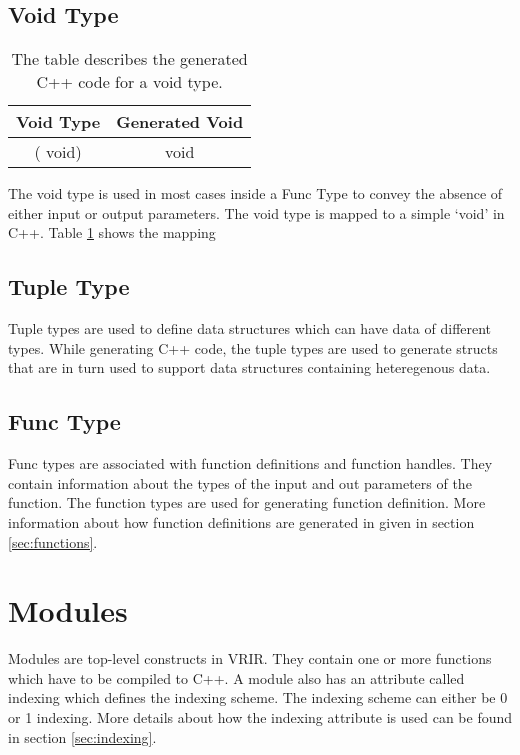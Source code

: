 \subsection{Void Type}
\begin{table}[htbp]
\centering
\begin{tabular}{|c|c|}
\hline
Void Type & Generated Void \\ \hline
( void)   & void           \\ \hline
\end{tabular}
\caption[voidTypeMapping]{The table describes the generated C++ code for a void type.}
\label{tab:voidTypeMap}
\end{table}
The void type is used in most cases inside a Func Type to convey the absence of either input or output parameters. The void type is mapped to a simple `void' in C++. Table \ref{tab:voidTypeMap} shows the mapping
\subsection{Tuple Type}
Tuple types are used to define data structures which can have data of different types. While generating C++ code, the tuple types are used to generate structs that are in turn used to support data structures containing heteregenous data.
\subsection{Func Type}
Func types are associated with function definitions and function handles. They contain information about the types of the input and out parameters of the function. The function types are used for generating function definition. More information about how function definitions are generated in given in section \ref{sec:functions}.
\section{Modules}
Modules are top-level constructs in VRIR. They contain one or more functions which have to be compiled to C++. A module also has an attribute called indexing which defines the indexing scheme. The indexing scheme can either be 0 or 1 indexing. More details about how the indexing attribute is used can be found in section \ref{sec:indexing}.
